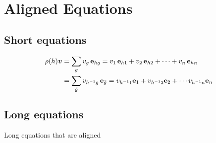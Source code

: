 \section{Aligned Equations}

\subsection{Short equations}

\begin{align}
    \rho(h) \boldsymbol{v} &= \sum_{g}{v_g \, \mathbf{e}_{hg}} = v_1 \, \mathbf{e}_{h1} + v_2 \, \mathbf{e}_{h2} + \cdots + v_n \, \mathbf{e}_{hn}
    \notag \\
    &= \sum_{\tilde{g}}{v_{h^{-1}\tilde{g}} \, \mathbf{e}_{\tilde{g}}} = v_{h^{-1} 1} \mathbf{e}_1 + v_{h^{-1} 2} \mathbf{e}_2 + \cdots v_{h^{-1} n} \mathbf{e}_n
    \label{eq:reg-repr-vector}
\end{align}

\subsection{Long equations}

Long equations that are aligned

